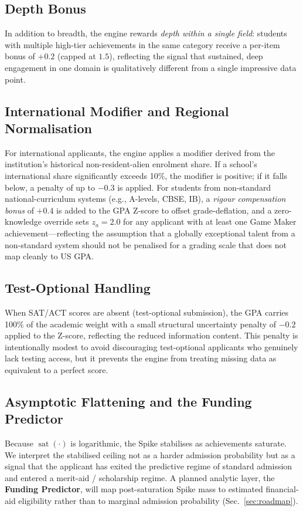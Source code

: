 \documentclass[conference]{IEEEtran}
\begin{document}
\subsection{Depth Bonus}
In addition to breadth, the engine rewards \textit{depth within a single field}: students with multiple high-tier achievements in the same category receive a per-item bonus of $+0.2$ (capped at $1.5$), reflecting the signal that sustained, deep engagement in one domain is qualitatively different from a single impressive data point.

\subsection{International Modifier and Regional Normalisation}
For international applicants, the engine applies a modifier derived from the institution's historical non-resident-alien enrolment share. If a school's international share significantly exceeds 10\%, the modifier is positive; if it falls below, a penalty of up to $-0.3$ is applied. For students from non-standard national-curriculum systems (e.g., A-levels, CBSE, IB), a \textit{rigour compensation bonus} of $+0.4$ is added to the GPA Z-score to offset grade-deflation, and a zero-knowledge override sets $z_a = 2.0$ for any applicant with at least one Game Maker achievement---reflecting the assumption that a globally exceptional talent from a non-standard system should not be penalised for a grading scale that does not map cleanly to US GPA.

\subsection{Test-Optional Handling}
When SAT/ACT scores are absent (test-optional submission), the GPA carries 100\% of the academic weight with a small structural uncertainty penalty of $-0.2$ applied to the Z-score, reflecting the reduced information content. This penalty is intentionally modest to avoid discouraging test-optional applicants who genuinely lack testing access, but it prevents the engine from treating missing data as equivalent to a perfect score.

\subsection{Asymptotic Flattening and the Funding Predictor}
Because $\operatorname{sat}(\cdot)$ is logarithmic, the Spike stabilises as achievements saturate. We interpret the stabilised ceiling not as a harder admission probability but as a signal that the applicant has exited the predictive regime of standard admission and entered a merit-aid / scholarship regime. A planned analytic layer, the \textbf{Funding Predictor}, will map post-saturation Spike mass to estimated financial-aid eligibility rather than to marginal admission probability (Sec.~\ref{sec:roadmap}).
\end{document}
